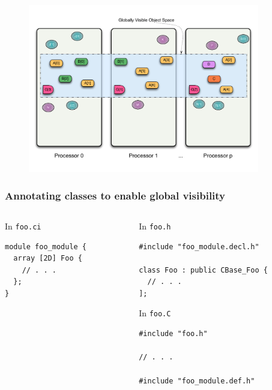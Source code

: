 \begin{frame}
  \frametitle{
  }
  \begin{figure}\includegraphics[width=0.9\textwidth]{../figures/progmodel/07-obj-programmer-view.pdf}\end{figure}
\end{frame}


\begin{frame}[fragile,t]
\frametitle{Annotating classes to enable global visibility}
\begin{columns}[t]
\begin{column}{0.4\textwidth}
\begin{block}{In \texttt{foo.ci}}
\begin{lstlisting}
module foo_module {
  array [2D] Foo {
    // . . .
  };
}
\end{lstlisting}
\end{block}
\end{column}
\begin{column}{0.5\textwidth}
\begin{block}{In \texttt{foo.h}}
\begin{lstlisting}
#include "foo_module.decl.h"

class Foo : public CBase_Foo {
  // . . . 
];
\end{lstlisting}
\end{block}
\begin{block}{In \texttt{foo.C}}
\begin{lstlisting}
#include "foo.h"

// . . . 

#include "foo_module.def.h"
\end{lstlisting}
\end{block}
\end{column}
\end{columns}
\end{frame}


